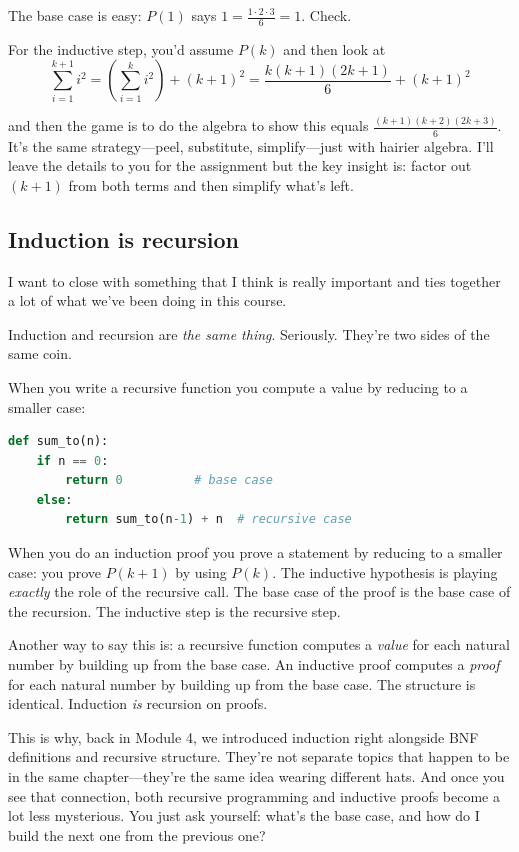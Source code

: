 \documentclass[11pt]{article}
\begin{document}
The base case is easy: $P(1)$ says $1 = \frac{1 \cdot 2 \cdot 3}{6} = 1$. Check.

For the inductive step, you'd assume $P(k)$ and then look at
\[
\sum_{i=1}^{k+1} i^2 = \left(\sum_{i=1}^{k} i^2\right) + (k+1)^2 = \frac{k(k+1)(2k+1)}{6} + (k+1)^2
\]

and then the game is to do the algebra to show this equals $\frac{(k+1)(k+2)(2k+3)}{6}$. It's the same strategy---peel, substitute, simplify---just with hairier algebra. I'll leave the details to you for the assignment but the key insight is: factor out $(k+1)$ from both terms and then simplify what's left.

\subsection{Induction is recursion}
I want to close with something that I think is really important and ties together a lot of what we've been doing in this course.

Induction and recursion are \emph{the same thing}. Seriously. They're two sides of the same coin.

When you write a recursive function you compute a value by reducing to a smaller case:
\begin{lstlisting}[language=Python]
def sum_to(n):
    if n == 0:
        return 0          # base case
    else:
        return sum_to(n-1) + n  # recursive case
\end{lstlisting}

When you do an induction proof you prove a statement by reducing to a smaller case: you prove $P(k+1)$ by using $P(k)$. The inductive hypothesis is playing \emph{exactly} the role of the recursive call. The base case of the proof is the base case of the recursion. The inductive step is the recursive step.

Another way to say this is: a recursive function computes a \emph{value} for each natural number by building up from the base case. An inductive proof computes a \emph{proof} for each natural number by building up from the base case. The structure is identical. Induction \emph{is} recursion on proofs.

This is why, back in Module 4, we introduced induction right alongside BNF definitions and recursive structure. They're not separate topics that happen to be in the same chapter---they're the same idea wearing different hats. And once you see that connection, both recursive programming and inductive proofs become a lot less mysterious. You just ask yourself: what's the base case, and how do I build the next one from the previous one?
\end{document}
